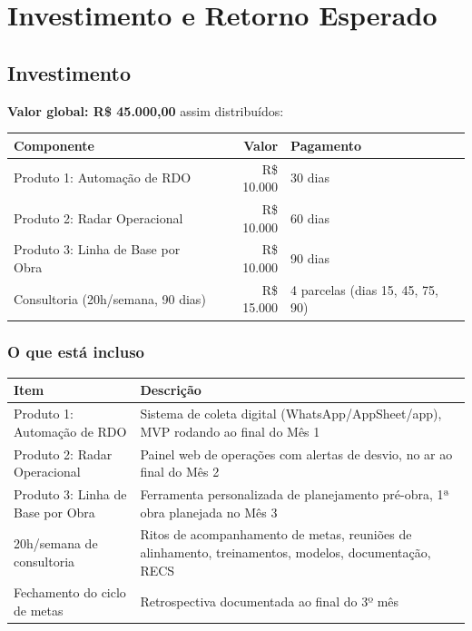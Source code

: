 \documentclass[12pt,a4paper]{scrartcl}
\begin{document}
\section{Investimento e Retorno Esperado}

\subsection{Investimento}

\textbf{Valor global: R\$ 45.000,00} assim distribuídos:

\vspace{0.3cm}
\begin{tabular}{p{6cm} r p{4cm}}
\textbf{Componente} & \textbf{Valor} & \textbf{Pagamento} \\
\hline
Produto 1: Automação de RDO & R\$ 10.000 & 30 dias \\
Produto 2: Radar Operacional & R\$ 10.000 & 60 dias \\
Produto 3: Linha de Base por Obra & R\$ 10.000 & 90 dias \\
Consultoria (20h/semana, 90 dias) & R\$ 15.000 & 4 parcelas (dias 15, 45, 75, 90) \\
\end{tabular}
\vspace{0.3cm}

\subsubsection{O que está incluso}

\begin{tabular}{p{5cm} p{10cm}}
\textbf{Item} & \textbf{Descrição} \\
\hline
Produto 1: Automação de RDO & Sistema de coleta digital (WhatsApp/AppSheet/app), MVP rodando ao final do Mês 1 \\
Produto 2: Radar Operacional & Painel web de operações com alertas de desvio, no ar ao final do Mês 2 \\
Produto 3: Linha de Base por Obra & Ferramenta personalizada de planejamento pré-obra, 1ª obra planejada no Mês 3 \\
20h/semana de consultoria & Ritos de acompanhamento de metas, reuniões de alinhamento, treinamentos, modelos, documentação, RECS \\
Fechamento do ciclo de metas & Retrospectiva documentada ao final do 3º mês \\
\end{tabular}
\end{document}
